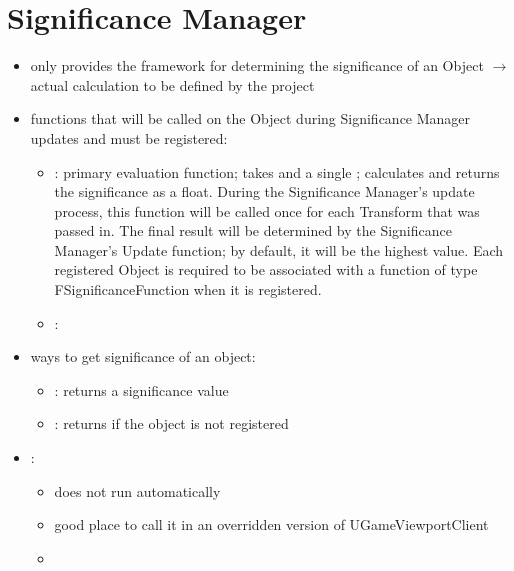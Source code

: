    \section{Significance Manager}
        \begin{itemize}
            \item only provides the framework for determining the significance of an Object $\rightarrow$ actual calculation to be defined by the project
            \item functions that will be called on the Object during Significance Manager updates and must be registered:
            \begin{itemize}
                \item {}: primary evaluation function; takes  and a single ;  calculates and returns the significance as a float. During the Significance Manager's update process, this function will be called once for each Transform that was passed in. The final result will be determined by the Significance Manager's Update function; by default, it will be the highest value. Each registered Object is required to be associated with a function of type FSignificanceFunction when it is registered. 
                \item {}: 
            \end{itemize}
            \item ways to get significance of an object:
            \begin{itemize}
                \item {}: returns a significance value
                \item {}: returns  if the object is not registered
            \end{itemize}
            \item {}:
            \begin{itemize}
                \item does not run automatically 
                \item good place to call it in an overridden version of UGameViewportClient
                \item 
            \end{itemize}
        \end{itemize}


    


